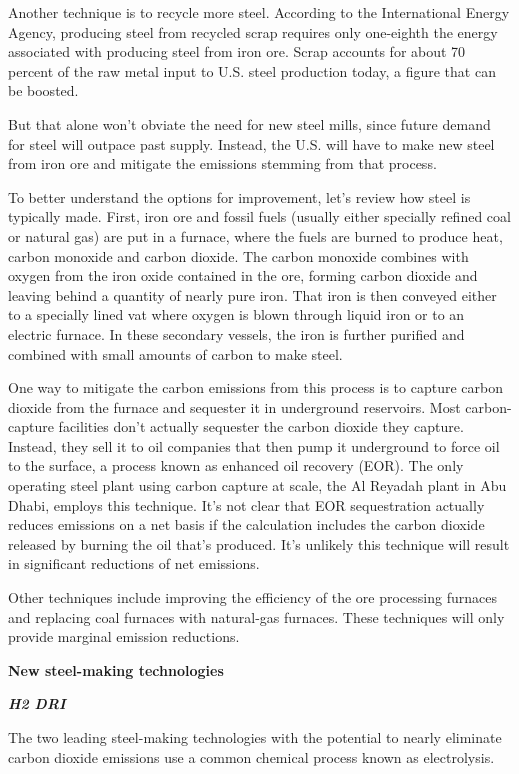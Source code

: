 \documentclass[
]{book}
\begin{document}
Another technique is to recycle more steel. According to the International Energy Agency, producing steel from recycled scrap requires only one-eighth the energy associated with producing steel from iron ore. Scrap accounts for about 70 percent of the raw metal input to U.S. steel production today, a figure that can be boosted.

But that alone won't obviate the need for new steel mills, since future demand for steel will outpace past supply. Instead, the U.S. will have to make new steel from iron ore and mitigate the emissions stemming from that process.

To better understand the options for improvement, let's review how steel is typically made. First, iron ore and fossil fuels (usually either specially refined coal or natural gas) are put in a furnace, where the fuels are burned to produce heat, carbon monoxide and carbon dioxide. The carbon monoxide combines with oxygen from the iron oxide contained in the ore, forming carbon dioxide and leaving behind a quantity of nearly pure iron. That iron is then conveyed either to a specially lined vat where oxygen is blown through liquid iron or to an electric furnace. In these secondary vessels, the iron is further purified and combined with small amounts of carbon to make steel.

One way to mitigate the carbon emissions from this process is to capture carbon dioxide from the furnace and sequester it in underground reservoirs.
Most carbon-capture facilities don't actually sequester the carbon dioxide they capture. Instead, they sell it to oil companies that then pump it underground to force oil to the surface, a process known as enhanced oil recovery (EOR).
The only operating steel plant using carbon capture at scale, the Al Reyadah plant in Abu Dhabi, employs this technique.
It's not clear that EOR sequestration actually reduces emissions on a net basis if the calculation includes the carbon dioxide released by burning the oil that's produced.
It's unlikely this technique will result in significant reductions of net emissions.

Other techniques include improving the efficiency of the ore processing furnaces and replacing coal furnaces with natural-gas furnaces. These techniques will only provide marginal emission reductions.

\textbf{New steel-making technologies}

\textbf{\emph{H2 DRI}}

The two leading steel-making technologies with the potential to nearly eliminate carbon dioxide emissions use a common chemical process known as electrolysis.
\end{document}
